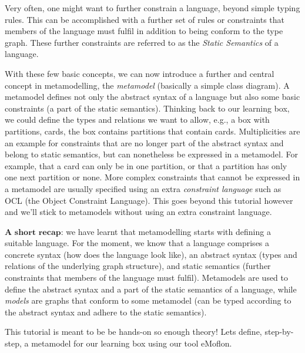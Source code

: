 Very often, one might want to further constrain a language, beyond simple typing rules.
This can be accomplished with a further set of rules or constraints that members of the language must fulfil in addition to being conform to the type graph.
These further constraints are referred to as the \emph{Static Semantics} of a language.

With these few basic concepts, we can now introduce a further and central concept in metamodelling, the \emph{metamodel} (basically a simple class diagram).
A metamodel defines not only the abstract syntax of a language but also some basic constraints (a part of the static semantics).
Thinking back to our learning box, we could define the types and relations we want to allow, e.g.,  a box with partitions, cards, the box contains partitions that contain cards.
Multiplicities are an example for constraints that are no longer part of the abstract syntax and belong to static semantics, but can nonetheless be expressed in a metamodel.
For example, that a card can only be in one partition, or that a partition has only one next partition or none.
More complex constraints that cannot be expressed in a metamodel are usually specified using an extra \emph{constraint language} such as OCL (the Object Constraint Language).
This goes beyond this tutorial however and we'll stick to metamodels without using an extra constraint language.

$\textbf{A short recap:}$  we have learnt that metamodelling starts with defining a suitable language.
For the moment, we know that a language comprises a concrete syntax (how does the language look like),  an abstract syntax (types and relations of the underlying graph structure), and static semantics (further constraints that members of the language must fulfil).
Metamodels are used to define the abstract syntax and a part of the static semantics of a language, while \emph{models} are graphs that conform to some
metamodel (can be typed  according to the abstract syntax and adhere to the static semantics).

This tutorial is meant to be be hands-on so enough theory!
Lets define, step-by-step, a metamodel for our learning box using our tool eMoflon.
